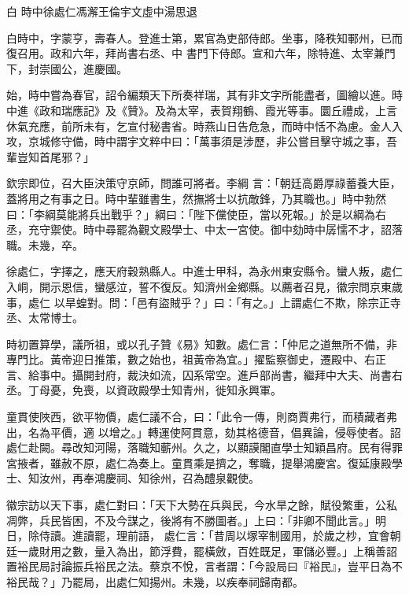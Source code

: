 
\begin{pinyinscope}

 白
 時中徐處仁馮澥王倫宇文虛中湯思退



 白時中，字蒙亨，壽春人。登進士第，累官為吏部侍郎。坐事，降秩知鄆州，已而復召用。政和六年，拜尚書右丞、中
 書門下侍郎。宣和六年，除特進、太宰兼門下，封崇國公，進慶國。



 始，時中嘗為春官，詔令編類天下所奏祥瑞，其有非文字所能盡者，圖繪以進。時中進《政和瑞應記》及《贊》。及為太宰，表賀翔鶴、霞光等事。圜丘禮成，上言休氣充應，前所未有，乞宣付秘書省。時燕山日告危急，而時中恬不為慮。金人入攻，京城修守備，時中謂宇文粹中曰：「萬事須是涉歷，非公嘗目擊守城之事，吾輩豈知首尾邪？」



 欽宗即位，召大臣決策守京師，問誰可將者。李綱
 言：「朝廷高爵厚祿蓄養大臣，蓋將用之有事之日。時中輩雖書生，然撫將士以抗敵鋒，乃其職也。」時中勃然曰：「李綱莫能將兵出戰乎？」綱曰：「陛下儻使臣，當以死報。」於是以綱為右丞，充守禦使。時中尋罷為觀文殿學士、中太一宮使。御中劾時中孱懦不才，詔落職。未幾，卒。



 徐處仁，字擇之，應天府穀熟縣人。中進士甲科，為永州東安縣令。蠻人叛，處仁入峒，開示恩信，蠻感泣，誓不復反。知濟州金鄉縣。以薦者召見，徽宗問京東歲事，處仁
 以旱蝗對。問：「邑有盜賊乎？」曰：「有之。」上謂處仁不欺，除宗正寺丞、太常博士。



 時初置算學，議所祖，或以孔子贊《易》知數。處仁言：「仲尼之道無所不備，非專門比。黃帝迎日推策，數之始也，祖黃帝為宜。」擢監察御史，遷殿中、右正言、給事中。攝開封府，裁決如流，囚系常空。進戶部尚書，繼拜中大夫、尚書右丞。丁母憂，免喪，以資政殿學士知青州，徙知永興軍。



 童貫使陜西，欲平物價，處仁議不合，曰：「此令一傳，則商賈弗行，而積藏者弗出，名為平價，適
 以增之。」轉運使阿貫意，劾其格德音，倡異論，侵辱使者。詔處仁赴闕。尋改知河陽，落職知蘄州。久之，以顯謨閣直學士知穎昌府。民有得罪宮掖者，雖赦不原，處仁為奏上。童貫乘是擠之，奪職，提舉鴻慶宮。復延康殿學士、知汝州，再奉鴻慶祠、知徐州，召為醴泉觀使。



 徽宗訪以天下事，處仁對曰：「天下大勢在兵與民，今水旱之餘，賦役繁重，公私凋弊，兵民皆困，不及今謀之，後將有不勝圖者。」上曰：「非卿不聞此言。」明日，除侍讀。進讀罷，理前語，
 處仁言：「昔周以塚宰制國用，於歲之杪，宜會朝廷一歲財用之數，量入為出，節浮費，罷橫斂，百姓既足，軍儲必豐。」上稱善詔置裕民局討論振兵裕民之法。蔡京不悅，言者謂：「今設局曰『裕民』，豈平日為不裕民哉？」乃罷局，出處仁知揚州。未幾，以疾奉祠歸南都。




\end{pinyinscope}
